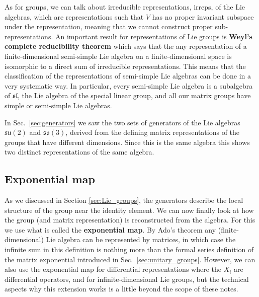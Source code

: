 \documentclass[notes.tex]{subfiles}
\begin{document}
As for groups, we can talk about irreducible representations, irreps, of the Lie algebras, which are representations such that $V$ has no proper invariant subspace under the representation, meaning that we cannot construct proper sub-representations.
An important result for representations of Lie groups is {\bf Weyl's complete reducibility theorem} which says that the any representation of a finite-dimensional semi-simple Lie algebra  on a finite-dimensional space is isomorphic to a direct sum of irreducible representations. This means that the classification of the representations of semi-simple Lie algebras can be done in a very systematic way. In particular, every semi-simple Lie algebra is a subalgebra of $\mathfrak {sl}$, the Lie algebra of the special linear group, and all our matrix groups have simple or semi-simple Lie algebras.

In Sec.~\ref{sec:generators} we saw the two sets of generators of the Lie algebras $\mathfrak{su(2)}$ and $\mathfrak{so(3)}$, derived from the defining matrix representations of the groups that have different dimensions. Since this is the same algebra this shows two distinct representations of the same algebra. 


\subsection{Exponential map}
\label{sec:expmap}
As we discussed in Section \ref{sec:Lie_groups}, the generators describe the local structure of the group near the identity element. We can now finally look at how the group (and matrix representation) is reconstructed from the algebra. For this we use what is called the {\bf exponential map}. 
By Ado's theorem any (finite-dimensional) Lie algebra can be represented by matrices, in which case the infinite sum in this definition is nothing more than the formal series definition of the matrix exponential introduced in Sec.~\ref{sec:unitary_groups}. However, we can also use the exponential map for differential representations where the $X_i$ are differential operators, and for infinite-dimensional Lie groups, but the technical aspects why this extension works is a little beyond the scope of these notes.
\end{document}

